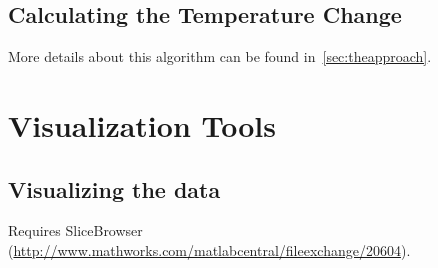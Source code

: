 \section{Calculating the Temperature Change}
More details about this algorithm can be found in~\cref{sec:theapproach}.

\chapter{Visualization Tools}
\label{ch:visualize}
\section{Visualizing the data}
Requires SliceBrowser (\url{http://www.mathworks.com/matlabcentral/fileexchange/20604}).
